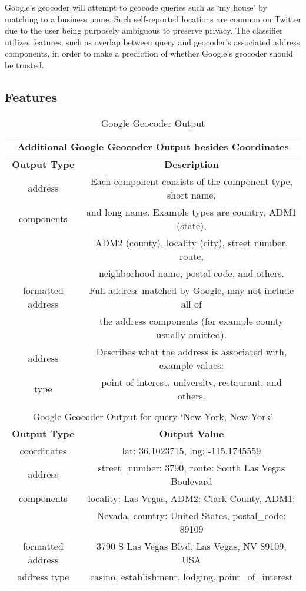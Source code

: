 Google's geocoder will attempt to geocode queries such as `my house' by matching to a business name. Such self-reported locations are common on Twitter due to the user being purposely ambiguous to preserve privacy. The classifier utilizes features, such as overlap between query and geocoder's associated address components, in order to make a prediction of whether Google's geocoder should be trusted.

\subsection{Features}

\begin{table}
\small
\renewcommand{\arraystretch}{1.2}
\caption{Google Geocoder Output}
\label{table_ch2_4}
\centering
\begin{tabular}{|c|c|}
\multicolumn{2}{c}{Additional Google Geocoder Output besides Coordinates}\\
\hline
\bfseries Output Type & \bfseries Description\\
\hline
address & Each component consists of the component type, short name, \\
components & and long name. Example types are country, ADM1 (state), \\
& ADM2 (county), locality (city), street number, route, \\
& neighborhood name, postal code, and others. \\
 \hline
formatted address&	Full address matched by Google, may not include all of \\
& the address components (for example county usually omitted). \\
 \hline
address & Describes what the address is associated with, example values: \\
type & point of interest, university, restaurant, and others. \\
\hline
\multicolumn{2}{c}{}\\
\multicolumn{2}{c}{Google Geocoder Output for query `New York, New York'}\\
\hline
\bfseries Output Type & \bfseries Output Value\\
\hline
coordinates & lat: 36.1023715, lng: -115.1745559\\
\hline
address & street\_number: 3790, route: South Las Vegas Boulevard\\
components & locality: Las Vegas, ADM2: Clark County, ADM1:\\
& Nevada, country: United States, postal\_code: 89109\\
\hline
formatted address& 3790 S Las Vegas Blvd, Las Vegas, NV 89109, USA\\
\hline
address type & casino, establishment, lodging, point\_of\_interest\\
\hline
\end{tabular}
\end{table}

